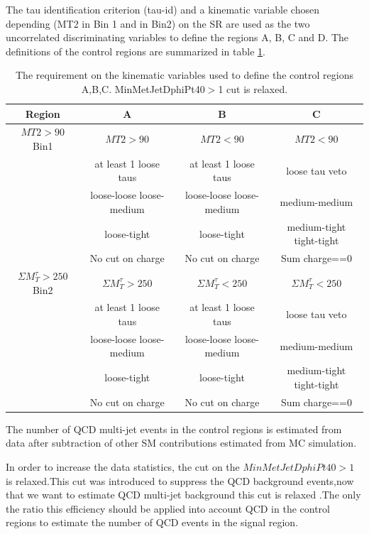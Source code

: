The tau identification criterion (tau-id) and a kinematic variable chosen depending (MT2 in Bin 1 and \SumMT in Bin2) 
on the SR are used as the two uncorrelated discriminating variables to define the regions A, B, C and D. The definitions of the control regions are summarized in table \ref{2QCDbg}.

\begin{table}
\begin{center}
\begin{tabular}{|c|c|c|c|}
\hline
Region&A& B & C
\\ \hline\hline
$MT2>90$ Bin1 &$MT2 >90$ & $MT2 <90$&$MT2 <90$ \\
 &at least 1 loose taus&at least 1 loose taus& loose tau veto\\
 &loose-loose loose-medium &loose-loose loose-medium &medium-medium \\
 &loose-tight&loose-tight&medium-tight tight-tight\\ 
 &No cut on charge&No cut on charge& Sum charge==0\\
\hline
$\Sigma M_{T}^{\tau}>250$ Bin2 &$\Sigma M_{T}^{\tau} >250$ &$\Sigma M_{T}^{\tau} <250$&$\Sigma M_{T}^{\tau} < 250$\\
 &at least 1 loose taus&at least 1 loose taus& loose tau veto\\
 &loose-loose loose-medium &loose-loose loose-medium &medium-medium \\
 &loose-tight&loose-tight&medium-tight tight-tight\\
 &No cut on charge&No cut on charge& Sum charge==0\\

\hline
\end{tabular}
\caption{The requirement on the kinematic variables used to define the control regions A,B,C.
MinMetJetDphiPt40$>$1 cut is relaxed. }
\label{2QCDbg}
\end{center}
\end{table}

The number of QCD multi-jet events in the control regions is estimated from data after subtraction of other SM contributions estimated from MC simulation.

In order to increase the data statistics, the cut on the $MinMetJetDphiPt40>1$ is relaxed.This cut was
introduced to suppress the QCD background events,now that we want to estimate QCD multi-jet background this cut is relaxed  .The only the ratio this efficiency should be
applied into account QCD in the control regions to estimate the number of QCD events in the signal region.

